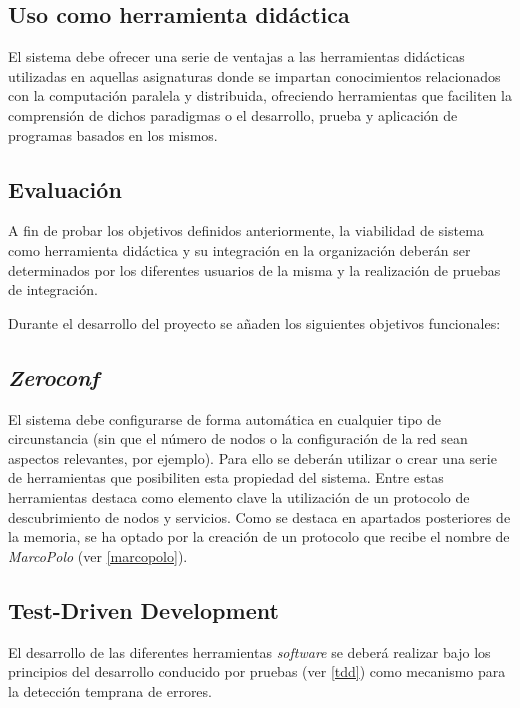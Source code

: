 \subsection{Uso como herramienta didáctica}

El sistema debe ofrecer una serie de ventajas a las herramientas didácticas utilizadas en aquellas asignaturas donde se impartan conocimientos relacionados con la computación paralela y distribuida, ofreciendo herramientas que faciliten la comprensión de dichos paradigmas o el desarrollo, prueba y aplicación de programas basados en los mismos.


\subsection{Evaluación}

A fin de probar los objetivos definidos anteriormente, la viabilidad de sistema como herramienta didáctica y su integración en la organización deberán ser determinados por los diferentes usuarios de la misma y la realización de pruebas de integración.

Durante el desarrollo del proyecto se añaden los siguientes objetivos funcionales:

\subsection{\textit{Zeroconf}}

El sistema debe configurarse de forma automática en cualquier tipo de circunstancia (sin que el número de nodos o la configuración de la red sean aspectos relevantes, por ejemplo). Para ello se deberán utilizar o crear una serie de herramientas que posibiliten esta propiedad del sistema. Entre estas herramientas destaca como elemento clave la utilización de un protocolo de descubrimiento de nodos y servicios. Como se destaca en apartados posteriores de la memoria, se ha optado por la creación de un protocolo que recibe el nombre de \textit{MarcoPolo} (ver \ref{marcopolo}).



\subsection{Test-Driven Development}

El desarrollo de las diferentes herramientas \textit{software} se deberá realizar bajo los principios del desarrollo conducido por pruebas (ver \ref{tdd}) como mecanismo para la detección temprana de errores.

